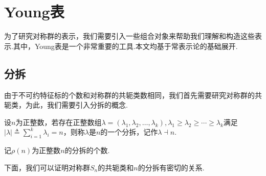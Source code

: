 \chapter{Young表}

为了研究对称群的表示，我们需要引入一些组合对象来帮助我们理解和构造这些表示.其中，Young表是一个非常重要的工具.本文均基于常表示论的基础展开.

\section{分拆}

由于不可约特征标的个数和对称群的共轭类数相同，我们首先需要研究对称群的共轭类，为此，我们需要引入分拆的概念.
\begin{definition}[分拆]
    设$n$为正整数，若存在正整数组$\lambda=(\lambda_1,\lambda_2,\ldots,\lambda_k),\lambda_1\geq\lambda_2\geq\cdots\geq\lambda_k$满足$|\lambda|\triangleq\sum_{i=1}^k\lambda_i=n$，则称$\lambda$是$n$的一个分拆，记作$\lambda\dashv n$.\par
    记$\rho(n)$为正整数$n$的分拆的个数.
\end{definition}

下面，我们可以证明对称群$S_n$的共轭类和$n$的分拆有密切的关系.


